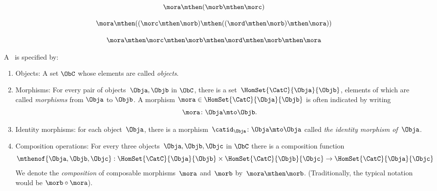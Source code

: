 {\begin{forslides}
        \begin{equation}
            \label{eq:12}
            \mora \mthen  (\morb \mthen \morc )
        \end{equation}

        \begin{equation}
            \label{eq:13}
            \mora \mthen  ((\morc \mthen \morb ) \mthen (( \mord \mthen \morb ) \mthen \mora ))
        \end{equation}

        \begin{equation}
            \label{eq:14}
            \mora \mthen  \morc \mthen \morb  \mthen \mord \mthen \morb  \mthen \mora
        \end{equation}

        \begin{ctdefinition}
            \label{def:category-var}
            A \emph{}~\CatC is specified by:
            \begin{body}
                \constit
                \begin{enumerate}
                    \item Objects: A set $\ObC$ whose elements are called \emph{objects}.
                    \item Morphisms: For every pair of objects~$\Obja,\Objb$ in $\ObC$, there is a set~$\HomSet{\CatC}{\Obja}{\Objb}$, elements of which are called \emph{morphisms} from $\Obja$ to $\Objb$.
                          A morphism $\mora \in \HomSet{\CatC}{\Obja}{\Objb}$ is often indicated by writing
                          \begin{equation*}
                              \mora \colon \Obja \mto \Objb.
                          \end{equation*}
                    \item Identity morphisms: for each object~$\Obja$, there is a morphism~$\catid_{\Obja}\colon \Obja \mto \Obja$  called \emph{the identity morphism of~$\Obja$}.
                    \item Composition operations: For every three objects~$\Obja,\Objb,\Objc$ in $\ObC$ there is a composition function
                          \begin{equation*}
                              \mthenof{\Obja,\Objb,\Objc}: \HomSet{\CatC}{\Obja}{\Objb} \times \HomSet{\CatC}{\Objb}{\Objc}\to \HomSet{\CatC}{\Obja}{\Objc}
                          \end{equation*}
                          We denote the \emph{composition} of composable morphisms~$\mora$ and~$\morb$ by~$\mora \mthen \morb$.
                          (Traditionally, the typical notation would be $\morb \circ \mora$).


\end{enumerate}
\end{body}
\end{ctdefinition}
\end{forslides}}
